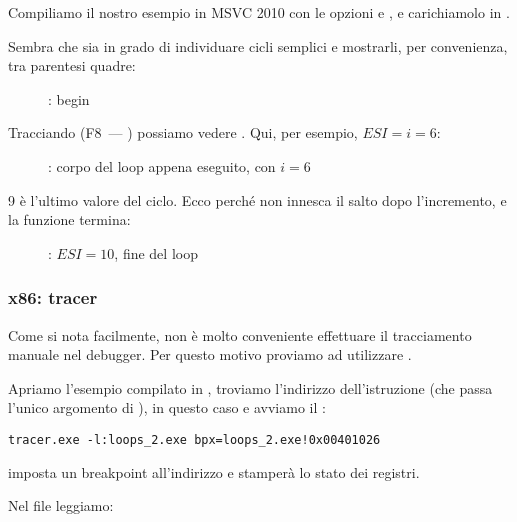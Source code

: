 Compiliamo il nostro esempio in MSVC 2010 con le opzioni \Ox e \Obzero, e carichiamolo in \olly.

Sembra che \olly sia in grado di individuare cicli semplici e mostrarli, per convenienza, tra parentesi quadre:

\begin{figure}[H]
\centering
{}
\caption{\olly: \main begin}
\label{fig:loops_olly_1}
\end{figure}

Tracciando (F8~--- \stepover) possiamo vedere \ESI 
{}.
Qui, per esempio, $ESI=i=6$:

\begin{figure}[H]
\centering
{}
\caption{\olly: corpo del loop appena eseguito, con $i=6$}
\label{fig:loops_olly_2}
\end{figure}

9 è l'ultimo valore del ciclo. Ecco perché \JL non innesca il salto dopo l'\gls{incremento}, e la funzione termina:

\begin{figure}[H]
\centering
{}
\caption{\olly: $ESI=10$, fine del loop}
\label{fig:loops_olly_3}
\end{figure}

\subsubsection{x86: tracer}

Come si nota facilmente, non è molto conveniente effettuare il tracciamento manuale nel debugger.
Per questo motivo proviamo ad utilizzare \tracer.

Apriamo l'esempio compilato in \IDA, troviamo l'indirizzo dell'istruzione 
(che passa l'unico argomento di \ttf), in questo caso  e avviamo il \tracer:

\begin{lstlisting}
tracer.exe -l:loops_2.exe bpx=loops_2.exe!0x00401026
\end{lstlisting}

 imposta un breakpoint all'indirizzo e \tracer stamperà lo stato dei registri.

Nel file  leggiamo:




